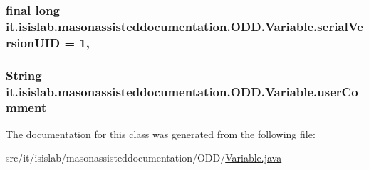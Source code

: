 \hypertarget{classit_1_1isislab_1_1masonassisteddocumentation_1_1_o_d_d_1_1_variable_a33eb58c0a40581dd0960a8c9ac3dcb02}{
\subsubsection[{serial\-Version\-U\-I\-D}]{\setlength{\rightskip}{0pt plus 5cm}final long it.\-isislab.\-masonassisteddocumentation.\-O\-D\-D.\-Variable.\-serial\-Version\-U\-I\-D = 1\hspace{0.3cm}{\ttfamily [static]}, {\ttfamily [private]}}}\label{classit_1_1isislab_1_1masonassisteddocumentation_1_1_o_d_d_1_1_variable_a33eb58c0a40581dd0960a8c9ac3dcb02}
\hypertarget{classit_1_1isislab_1_1masonassisteddocumentation_1_1_o_d_d_1_1_variable_a884cf9e8bd7fc7fca3391d3f4954e483}{
\subsubsection[{user\-Comment}]{\setlength{\rightskip}{0pt plus 5cm}String it.\-isislab.\-masonassisteddocumentation.\-O\-D\-D.\-Variable.\-user\-Comment\hspace{0.3cm}{\ttfamily [package]}}}\label{classit_1_1isislab_1_1masonassisteddocumentation_1_1_o_d_d_1_1_variable_a884cf9e8bd7fc7fca3391d3f4954e483}


The documentation for this class was generated from the following file\-:\begin{DoxyCompactItemize}
\item 
src/it/isislab/masonassisteddocumentation/\-O\-D\-D/\hyperlink{_variable_8java}{Variable.\-java}\end{DoxyCompactItemize}
